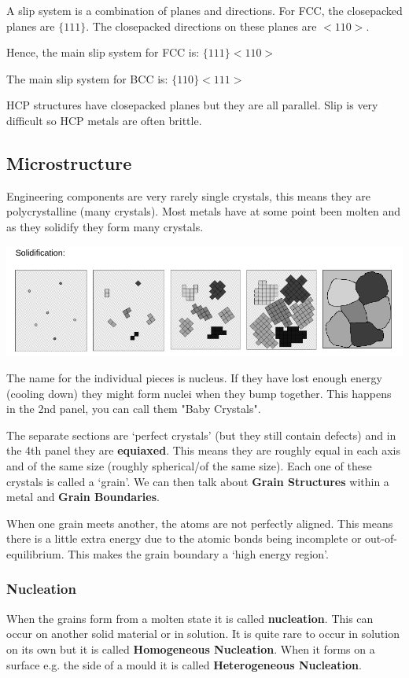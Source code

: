 \documentclass[12pt]{article}
\begin{document}
A slip system is a combination of planes and directions.
For FCC, the closepacked planes are $\{111\}$.
The closepacked directions on these planes are $<110>$.

Hence, the main slip system for FCC is: $\{111\}<110>$

The main slip system for BCC is: $\{110\}<111>$

HCP structures have closepacked planes but they are all parallel.
Slip is very difficult so HCP metals are often brittle. 

\subsection{Microstructure}
Engineering components are very rarely single crystals, this means they are polycrystalline (many crystals).
Most metals have at some point been molten and as they solidify they form many crystals.

\includegraphics[scale=0.4]{solidification}

The name for the individual pieces is nucleus.
If they have lost enough energy (cooling down) they might form nuclei when they bump together.
This happens in the 2nd panel, you can call them "Baby Crystals".

The separate sections are `perfect crystals' (but they still contain defects) and in the 4th panel they are \textbf{equiaxed}. 
This means they are roughly equal in each axis and of the same size (roughly spherical/of the same size).
Each one of these crystals is called a `grain'.  
We can then talk about \textbf{Grain Structures} within a metal and \textbf{Grain Boundaries}.

When one grain meets another, the atoms are not perfectly aligned. 
This means there is a little extra energy due to the atomic bonds being incomplete or out-of-equilibrium.
This makes the grain boundary a `high energy region'.

\subsubsection{Nucleation}
When the grains form from a molten state it is called \textbf{nucleation}. 
This can occur on another solid material or in solution. 
It is quite rare to occur in solution on its own but it is called \textbf{Homogeneous Nucleation}.
When it forms on a surface e.g. the side of a mould it is called \textbf{Heterogeneous Nucleation}.
\end{document}
